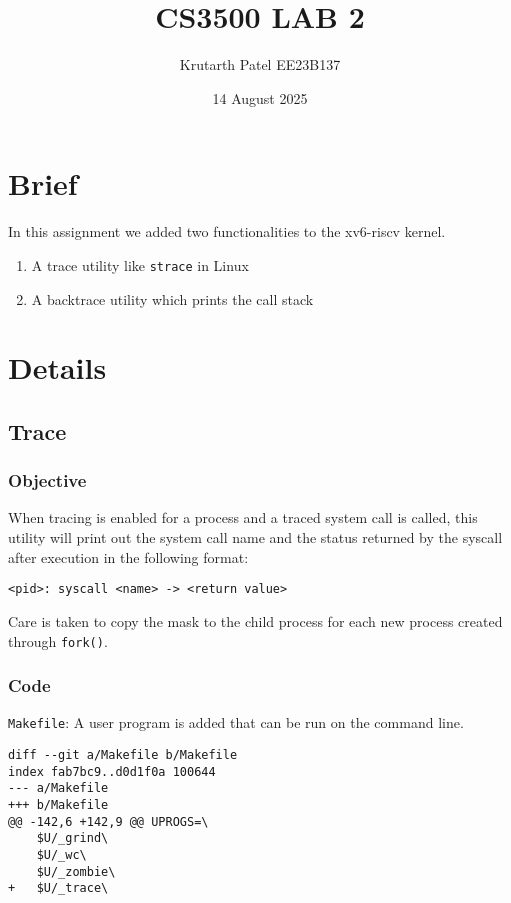 \documentclass{article}
\title{CS3500 LAB 2}
\author{Krutarth Patel EE23B137}
\date{14 August 2025}
\begin{document}
\maketitle
\section*{Brief}
In this assignment we added two functionalities to the xv6-riscv kernel.
\begin{enumerate}
	\item A trace utility like \texttt{strace} in Linux
	\item A backtrace utility which prints the call stack
\end{enumerate}

\section*{Details}

\subsection{Trace}
\subsubsection*{Objective}
When tracing is enabled for a process and a traced system call is called, this utility will print out the system call name and the status returned by the syscall after execution in the following format: \newline

\begin{center}
\texttt{<pid>:
syscall <name> -> <return value>}
\end{center}

Care is taken to copy the mask to the child process for each new process created through \texttt{fork()}.

\subsubsection*{Code}
\texttt{Makefile}:
A user program is added that can be run on the command line.
\newline
\begin{verbatim}
diff --git a/Makefile b/Makefile
index fab7bc9..d0d1f0a 100644
--- a/Makefile
+++ b/Makefile
@@ -142,6 +142,9 @@ UPROGS=\
 	$U/_grind\
 	$U/_wc\
 	$U/_zombie\
+	$U/_trace\
\end{verbatim}
\end{document}
